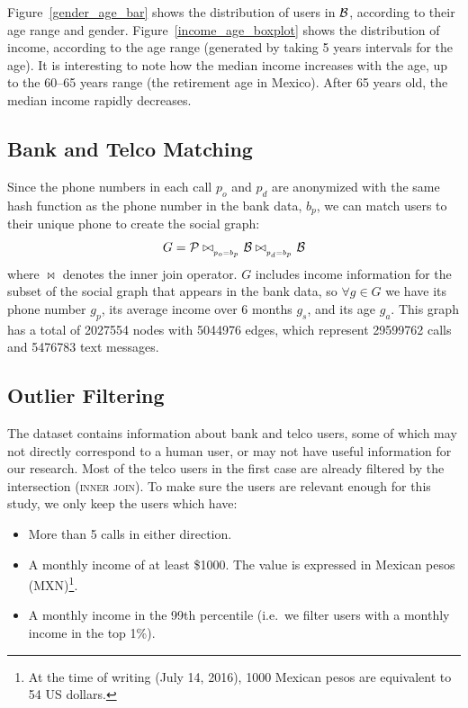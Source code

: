 Figure~\ref{gender_age_bar} shows the distribution of users in $\mathcal{B}$, according to their age range and gender.
Figure~\ref{income_age_boxplot} shows the distribution of income, according to the age range (generated by taking 5 years intervals for the age).
It is interesting to note how the median income increases with the age, up to
the 60--65 years range (the retirement age in Mexico). After 65 years old, the median income rapidly decreases.


\subsection{Bank and Telco Matching}

Since the phone numbers in each call $ p_o $ and $ p_d $ are anonymized with the same hash function as the phone number in the bank data, $ b_p $, we can match users to their unique phone to create the social graph:
$$ G = \mathcal{P} \bowtie_{_{p_o = b_p}} \mathcal{B} \bowtie_{_{p_d = b_p}} \mathcal{B} $$
where $\bowtie$ denotes the inner join operator.
$G$ includes income information for the subset of the social graph that appears in the bank data, so \( \forall g \in G \) we have its phone number \( g_p \),  its average income over 6 months \( g_s \), and its age \( g_a \).
This graph has a total of \num{2027554} nodes with \num{5044976} edges, which represent \num{29599762} calls and \num{5476783} text messages.

\subsection{Outlier Filtering}

The dataset contains information about bank and telco users, some of which may not directly correspond to a human user, %
or may not have useful information for our research.
Most of the telco users in the first case are already filtered by the intersection (\textsc{inner join}). To make sure the users are relevant enough for this study, we only keep the users which have:

\begin{itemize}
	\item More than 5 calls in either direction.
	\item A monthly income of at least \$\num{1000}.
	The value is expressed in Mexican pesos (MXN)\footnote{At the time of writing (July 14, 2016), 1000 Mexican pesos are equivalent to 54 US dollars.}.
	\item A monthly income in the \num{99}th percentile (i.e.\ we filter users with a monthly income in the top 1\%).
\end{itemize}


